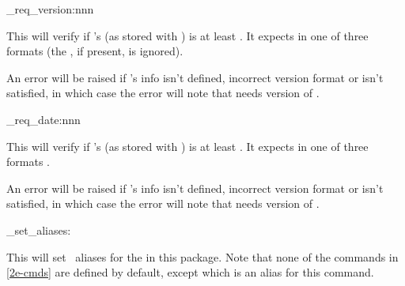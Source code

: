 \documentclass[10pt]{article}
\begin{document}


\begin{codedescribe}{\pkginfograb_req_version:nnn}
\begin{codesyntax}%
\end{codesyntax}
This will verify if 's  (as stored with ) is at least . It expects  in one of three formats  (the \tsobj[key]{[v]}, if present, is ignored).
\end{codedescribe}
\begin{tsremark}
  An error will be raised if 's info isn't defined, incorrect version format or  isn't satisfied, in which case the error will note that  needs version  of .
\end{tsremark}

\begin{codedescribe}{\pkginfograb_req_date:nnn}
\begin{codesyntax}%
\end{codesyntax}
This will verify if 's  (as stored with ) is at least . It expects  in one of three formats  .
\end{codedescribe}
\begin{tsremark}
  An error will be raised if 's info isn't defined, incorrect version format or  isn't satisfied, in which case the error will note that  needs version  of .
\end{tsremark}


\begin{codedescribe}{\pkginfograb_set_aliases:}
\begin{codesyntax}%
\end{codesyntax}
This will set \LaTeXe\  aliases for the  in this package. Note that none of the commands in \ref{2e-cmds} are defined by default, except \tsobj{\PkgInfoSetAliases} which is an alias for this command.
\end{codedescribe}
\end{document}
